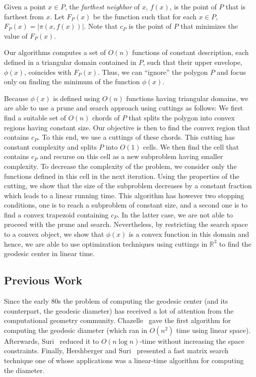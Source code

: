 \documentclass[a4paper,UKenglish]{lipics}
\newcommand{\F}[2]{\ensuremath{F_{\scriptscriptstyle #1}(#2)}}
\newcommand{\ff}[1]{\ensuremath{f(#1)}}
\newcommand{\cp}{\ensuremath{c_P}}
\newcommand{\g}[2]{\ensuremath{|\pi(#1, #2)|}}
\begin{document}
Given a point $x\in P$, the \emph{farthest neighbor} of $x$, $\ff{x}$, is the point of $P$ that is farthest from $x$. 
Let $\F{P}{x}$ be the function such that for each $x\in P$, $\F{P}{x} = \g{x}{\ff{x}}$.
Note that $\cp$ is the point of $P$ that minimizes the value of  $\F{P}{x}$.

Our algorithms computes a set of $O(n)$ functions of constant description, 
each defined in a triangular domain contained in $P$,
such that their upper envelope, $\phi(x)$, coincides with $\F{P}{x}$.
Thus, we can ``ignore'' the polygon $P$ and focus only on finding the minimum of the function $\phi(x)$.

Because $\phi(x)$ is defined using $O(n)$ functions having triangular domains, 
we are able to use a prune and search approach using cuttings as follows:
We first find a suitable set of $O(n)$ chords of $P$ that splits the polygon into convex regions having constant size.
Our objective is then to find the convex region that contains $\cp$. 
To this end, we use a cuttings of these chords. This cutting has constant complexity and splits $P$ into $O(1)$ cells. 
We then find the cell that contains $\cp$ and recurse on this cell as a new subproblem having smaller complexity. 
To decrease the complexity of the problem, we consider only the functions defined in this cell in the next iteration. 
Using the properties of the cutting, we show that the size of the subproblem decreases by a constant fraction which leads to a linear running time. 
This algorithm has however two stopping conditions, 
one is to reach a subproblem of constant size, 
and a second one is to find a convex trapezoid containing $\cp$.
In the latter case, we are not able to proceed with the prune and search. 
Nevertheless, by restricting the search space to a convex object, 
we show that $\phi(x)$ is a convex function in this domain and hence, 
we are able to use optimization techniques using 
cuttings in $\mathbb{R}^3$ to find the geodesic center in linear time. 

\subsection{Previous Work}
Since the early 80s the problem of computing the geodesic center (and its counterpart, the geodesic diameter) has received a lot of attention from the computational geometry community. Chazelle~\cite{c-tpca-82} gave the first algorithm for computing the geodesic diameter (which ran in $O(n^2)$ time using linear space). Afterwards, Suri~\cite{suri1989computing} reduced it to $O(n\log n)$-time without increasing the space constraints. Finally, Hershberger and Suri~\cite{hershberger1993matrix} presented a fast matrix search technique one of whose applications was a linear-time algorithm for computing the diameter.
\end{document}
